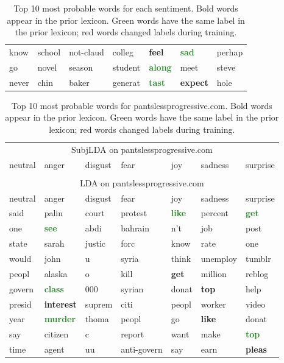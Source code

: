 \documentclass{article}
\begin{document}
\begin{table}
\begin{tabular}{ l l l l l l l  }
know & school & not-claud & colleg & \textcolor{BrickRed}{\textbf{feel}} & \textcolor{ForestGreen}{\textbf{sad}} & perhap \\
go & novel & season & student & \textcolor{ForestGreen}{\textbf{along}} & meet & steve \\
never & chin & baker & generat & \textcolor{ForestGreen}{\textbf{tast}} & \textcolor{BrickRed}{\textbf{expect}} & hole \\
\end{tabular}
\caption{Top 10 most probable words for each sentiment. Bold words
appear in the prior lexicon. Green words have the same label in the
prior lexicon; red words changed labels during training.\label{tab:words}}
\end{table}

\begin{table} \label{tab:pantsless}
\centering
\begin{tabular}{ l l l l l l l  }
\multicolumn{7}{c}{ \sc SubjLDA on pantslessprogressive.com }\\
\sc neutral & \sc anger & \sc disgust & \sc fear & \sc joy & \sc sadness & \sc surprise \\
\hline
\multicolumn{7}{c}{ } \\
\multicolumn{7}{c}{ \sc LDA on pantslessprogressive.com }\\
\sc neutral & \sc anger & \sc disgust & \sc fear & \sc joy & \sc sadness & \sc surprise \\
\hline
said & palin & court & protest & \textcolor{ForestGreen}{\textbf{like}} & percent & \textcolor{ForestGreen}{\textbf{get}} \\
one & \textcolor{ForestGreen}{\textbf{see}} & abdi & bahrain & n't & job & post \\
state & sarah & justic & forc & know & rate & one \\
would & john & u & syria & think & unemploy & tumblr \\
peopl & alaska & o & kill & \textcolor{BrickRed}{\textbf{get}} & million & reblog \\
govern & \textcolor{ForestGreen}{\textbf{class}} & 000 & syrian & donat & \textcolor{BrickRed}{\textbf{top}} & help \\
presid & \textcolor{BrickRed}{\textbf{interest}} & suprem & citi & peopl & worker & video \\
year & \textcolor{ForestGreen}{\textbf{murder}} & thoma & peopl & go & \textcolor{BrickRed}{\textbf{like}} & donat \\
say & citizen & c & report & want & make & \textcolor{ForestGreen}{\textbf{top}} \\
time & agent & uu & anti-govern & say & earn & \textcolor{BrickRed}{\textbf{pleas}} \\
\end{tabular}
\caption{Top 10 most probable words for pantslessprogressive.com. Bold words appear in the prior lexicon. Green words have the same label in the prior lexicon; red words changed labels during training.}
\end{table}
\end{document}
